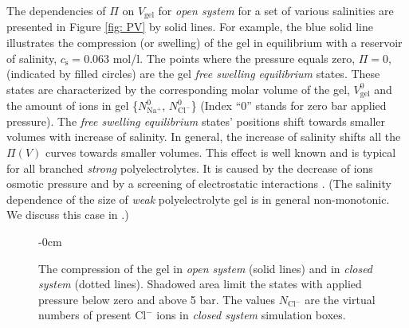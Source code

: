 \documentclass[journal,article,submit,pdftex,moreauthors]{Definitions/mdpi}
\newcommand{\ncl}{n_\mathrm{Cl^-}}
\newcommand{\Nna}{N_\mathrm{Na^+}}
\newcommand{\Ncl}{N_\mathrm{Cl^-}}
\newcommand{\cl}{\mathrm{Cl^-}}
\newcommand{\cs}{c_{\mathrm{s}}}
\newcommand{\Vgel}{V_\mathrm{gel}}
\newcommand{\Pgel}{\Pi}
\begin{document}
The dependencies of $\Pgel$ on $\Vgel$ for \emph{open system} for a set of various salinities are presented
in Figure \ref{fig: PV} by solid lines. 
For example, the blue solid line illustrates the compression (or swelling) of the gel in equilibrium with a reservoir of salinity, $\cs=0.063$ mol/l. 
The points where the pressure equals zero, $\Pgel=0$, (indicated by filled circles) are the gel \emph{free swelling equilibrium} states.
These states are characterized by the corresponding molar volume of the gel, $\Vgel^0$ and the amount of ions in gel \{$\Nna^0$, $\Ncl^0$\} 
(Index ``0'' stands for zero bar applied pressure).
The \emph{free swelling equilibrium} states' positions shift towards smaller volumes with increase of salinity. 
In general, the increase of salinity shifts all the $\Pgel(V)$ curves towards smaller volumes.
This effect is well known and is typical for all branched \emph{strong} polyelectrolytes. 
It is caused by the decrease of ions osmotic pressure and by a screening of electrostatic interactions \cite{Zhulina2000, Landsgesel2020a}.
(The salinity dependence of the size of \emph{weak} polyelectrolyte gel is in general non-monotonic. We discuss this case in \cite{Rud2018}.)

\begin{figure}[h]
\begin{adjustwidth}{-\extralength}{0cm}
\hspace{0.02\textwidth}
\caption{The compression of the gel in \emph{open system} (solid lines) and in \emph{closed system} (dotted lines). 
Shadowed area limit the states with applied pressure below zero and above 5 bar.
The values $N_\cl$ are the virtual numbers of present $\cl$ ions in \emph{closed system} simulation boxes.
\label{fig: NV and CN}}
\end{adjustwidth}
\end{figure}
\end{document}
